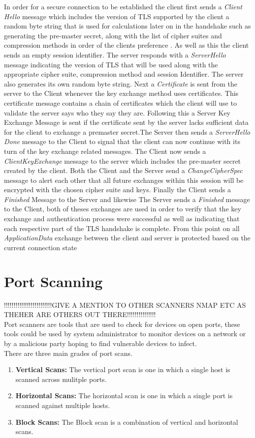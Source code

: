 \documentclass[a4wide,leqno,12pt]{report}
\begin{document}
In order for a secure connection to be established the client first sends a \textit{Client Hello} message which includes the version of TLS supported by the client a random byte string that is used for calculations later on in the handshake such as generating the pre-master secret,  along with the list of cipher suites and compression methods in order of the clients preference \cite{tlsDemoServer}. As well as this the client sends an empty session identifier\cite{turner2014transport}.
The server responds with a \textit{ServerHello} message indicating the version of TLS that will be used along with the appropriate cipher suite, compression method and session Identifier. The server also generates its own random byte string. Next a \textit{Certificate} is sent from the server to the Client whenever the key exchange method uses certificates. This certificate message contains a chain of certificates which the client will use to validate the server says who they say they are. Following this a Server Key Exchange Message is sent if the certificate sent by the server lacks sufficient data for the client to exchange a premaster secret.The Server then sends a \textit{ServerHello Done} message to the Client to signal that the client can now continue with its turn of the key exchange related messages. The Client now sends a \textit{ClientKeyExchange} message to the server which includes the pre-master secret created by the client. Both the Client and the Server send a \textit{ChangeCipherSpec} message to alert each other that all future exchanges within this session will be encrypted with the chosen cipher suite and keys. Finally the Client sends a \textit{Finished} Message to the Server and likewise The Server sends a \textit{Finished } message to the Client, both of theses exchanges are used in order to verify that the key exchange and authentication process were successful as well as indicating that each respective part of the TLS handshake is complete. From this point on all \textit{ApplicationData} exchange between the client and server is protected based on the current connection state \cite{tlsDemoServer}\cite{turner2014transport}
\section{Port Scanning}
!!!!!!!!!!!!!!!!!!!!!!!!!GIVE A MENTION TO OTHER SCANNERS NMAP ETC AS THEHER ARE OTHERS OUT THERE!!!!!!!!!!!!!!!\\
Port scanners are tools that are used to check for devices on open ports, these tools could be used by system administrator to monitor devices on a network or by a malicious party hoping to find vulnerable devices to infect. \\
There are three main grades of port scans.
\begin{enumerate}
\item\textbf{Vertical Scans:}
The vertical port scan is one in which a single host is scanned across mulitple ports.
\item\textbf{Horizontal Scans:}
The horizontal scan is one in which a single port is scanned against multiple hosts.
\item\textbf{Block Scans:}
The Block scan is a combination of vertical and horizontal scans.\cite{lee2003detection}
\end{enumerate}
\end{document}
